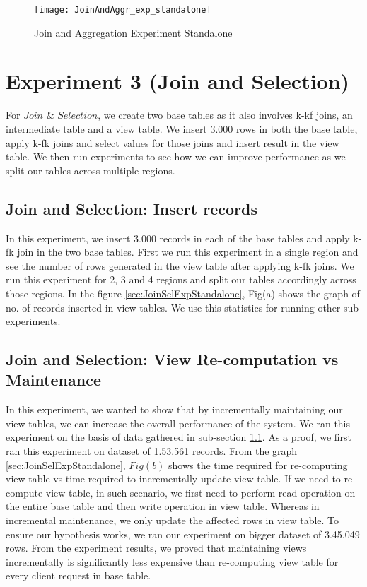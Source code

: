 \documentclass[11pt,a4paper,bibtotoc,idxtotoc,headsepline,footsepline,footexclude,BCOR12mm,DIV13]{scrbook}
\begin{document}
\begin{figure}
	\centering
	\texttt{[image: JoinAndAggr\_exp\_standalone]}
	\caption{Join and Aggregation Experiment Standalone}
	\label{sec:JoinAggrExpStandalone}
	
\end{figure} 
\newpage

\section{Experiment 3 (Join and Selection)}
\label{(sec:Join and Selection Exp Standalone)} 
For $Join$ \& $Selection$, we create two base tables as it also involves k-kf joins, an intermediate table and a view table. We insert 3.000 rows in both the base table, apply k-fk joins and select values for those joins and insert result in the view table. We then run experiments to see how we can improve performance as we split our tables across multiple regions.

\subsection{Join and Selection: Insert records}
\label{Join and Selection: Insert records Standalone}
In this experiment, we insert 3.000 records in each of the base tables and apply k-fk join in the two base tables. First we run this experiment in a single region and see the number of rows generated in the view table after applying k-fk joins. We run this experiment for 2, 3 and 4 regions and split our tables accordingly across those regions. In the figure \ref{sec:JoinSelExpStandalone}, Fig(a) shows the graph of no. of records inserted in view tables. We use this statistics for running other sub-experiments.

\subsection{Join and Selection: View Re-computation vs Maintenance}
\label{Join and Selection: View Re-computation vs Maintenance Standalone}
In this experiment, we wanted to show that by incrementally maintaining our view tables, we can increase the overall performance of the system. We ran this experiment on the basis of data gathered in sub-section \ref{Join and Selection: Insert records Standalone}. As a proof, we first ran this experiment on dataset of 1.53.561 records. From the graph \ref{sec:JoinSelExpStandalone}, $Fig(b)$ shows the time required for re-computing view table vs time required to incrementally update view table. If we need to re-compute view table, in such scenario, we first need to perform read operation on the entire base table and then write operation in view table. Whereas in incremental maintenance, we only update the affected rows in view table. To ensure our hypothesis works, we ran our experiment on bigger dataset of 3.45.049 rows. From the experiment results, we proved that maintaining views incrementally is significantly less expensive than re-computing view table for every client request in base table.
\end{document}
